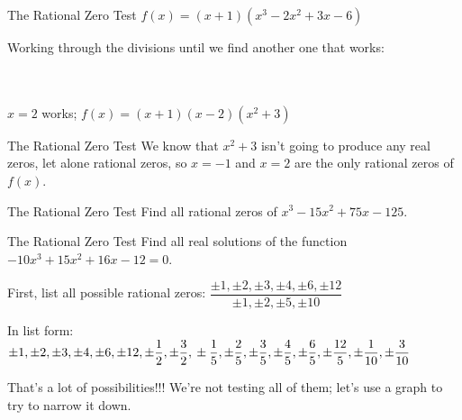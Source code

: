 \documentclass[t]{beamer}
\begin{document}
	\begin{frame}{The Rational Zero Test}
		$f(x) = (x+1)(x^3 - 2x^2 + 3x - 6)$
		
		Working through the divisions until we find another one that works:
		
		\pause
		
		 \pause {} \\
		 \pause \\ $x = 2$ works; $f(x) = (x+1)(x-2)(x^2 + 3)$
	\end{frame}

	\begin{frame}{The Rational Zero Test}
		We know that $x^2 + 3$ isn't going to produce any real zeros, let alone rational zeros, so $x = -1$ and $x = 2$ are the only rational zeros of $f(x)$.
	\end{frame}
	
	\begin{frame}{The Rational Zero Test}
		Find all rational zeros of $x^3 - 15x^2 + 75x - 125$.
		
		
		
		
		 
		 
		 
		 
	\end{frame}

	\begin{frame}{The Rational Zero Test}
		Find all real solutions of the function $-10x^3 + 15x^2 + 16x - 12 = 0$.
		
		\pause
		
		First, list all possible rational zeros: $\dfrac{\pm 1, \pm 2, \pm 3, \pm 4, \pm 6, \pm 12}{\pm 1, \pm 2, \pm 5, \pm 10}$ \pause
		
		In list form: $\pm 1, \pm 2, \pm 3, \pm 4, \pm 6, \pm 12, \pm \dfrac12, \pm \dfrac32, \newline \pm \dfrac15, \pm \dfrac25, \pm\dfrac35, \pm\dfrac45, \pm\dfrac65, \pm\dfrac{12}{5}, \pm\dfrac{1}{10}, \pm\dfrac{3}{10}$ \vspace{18pt} \pause
		
		That's a lot of possibilities!!! We're not testing all of them; let's use a graph to try to narrow it down.
	\end{frame}
\end{document}
